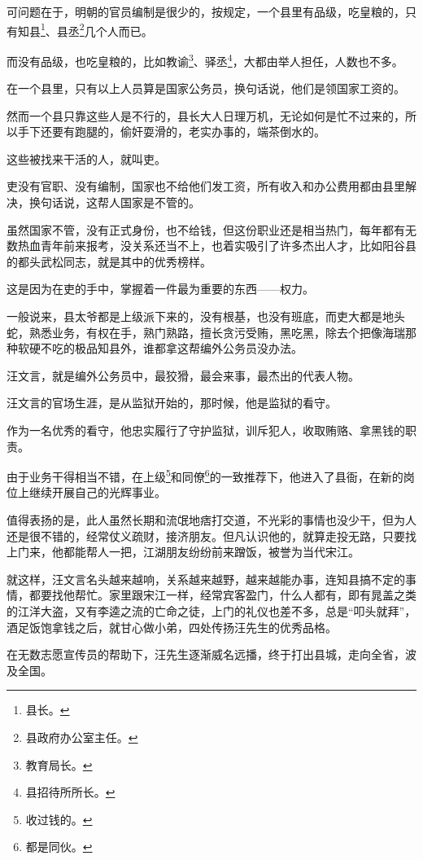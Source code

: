 \begin{multicols}{\theparacolNo}
		可问题在于，明朝的官员编制是很少的，按规定，一个县里有品级，吃皇粮的，只有知县\footnote{县长。}、县丞\footnote{县政府办公室主任。}几个人而已。

		而没有品级，也吃皇粮的，比如教谕\footnote{教育局长。}、驿丞\footnote{县招待所所长。}，大都由举人担任，人数也不多。

		在一个县里，只有以上人员算是国家公务员，换句话说，他们是领国家工资的。

		然而一个县只靠这些人是不行的，县长大人日理万机，无论如何是忙不过来的，所以手下还要有跑腿的，偷奸耍滑的，老实办事的，端茶倒水的。

		这些被找来干活的人，就叫吏。

		吏没有官职、没有编制，国家也不给他们发工资，所有收入和办公费用都由县里解决，换句话说，这帮人国家是不管的。

		虽然国家不管，没有正式身份，也不给钱，但这份职业还是相当热门，每年都有无数热血青年前来报考，没关系还当不上，也着实吸引了许多杰出人才，比如阳谷县的都头武松同志，就是其中的优秀榜样。

		这是因为在吏的手中，掌握着一件最为重要的东西——权力。

		一般说来，县太爷都是上级派下来的，没有根基，也没有班底，而吏大都是地头蛇，熟悉业务，有权在手，熟门熟路，擅长贪污受贿，黑吃黑，除去个把像海瑞那种软硬不吃的极品知县外，谁都拿这帮编外公务员没办法。

		汪文言，就是编外公务员中，最狡猾，最会来事，最杰出的代表人物。

		汪文言的官场生涯，是从监狱开始的，那时候，他是监狱的看守。

		作为一名优秀的看守，他忠实履行了守护监狱，训斥犯人，收取贿赂、拿黑钱的职责。

		由于业务干得相当不错，在上级\footnote{收过钱的。}和同僚\footnote{都是同伙。}的一致推荐下，他进入了县衙，在新的岗位上继续开展自己的光辉事业。

		值得表扬的是，此人虽然长期和流氓地痞打交道，不光彩的事情也没少干，但为人还是很不错的，经常仗义疏财，接济朋友。但凡认识他的，就算走投无路，只要找上门来，他都能帮人一把，江湖朋友纷纷前来蹭饭，被誉为当代宋江。

		就这样，汪文言名头越来越响，关系越来越野，越来越能办事，连知县搞不定的事情，都要找他帮忙。家里跟宋江一样，经常宾客盈门，什么人都有，即有晁盖之类的江洋大盗，又有李逵之流的亡命之徒，上门的礼仪也差不多，总是“叩头就拜”，酒足饭饱拿钱之后，就甘心做小弟，四处传扬汪先生的优秀品格。

		在无数志愿宣传员的帮助下，汪先生逐渐威名远播，终于打出县城，走向全省，波及全国。


\end{multicols}
